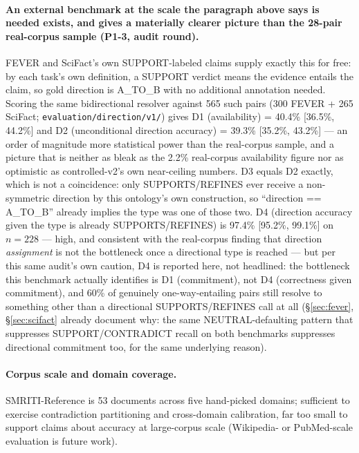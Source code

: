 \paragraph{An external benchmark at the scale the paragraph above says
is needed exists, and gives a materially clearer picture than the
28-pair real-corpus sample (P1-3, audit round).} FEVER and SciFact's own
SUPPORT-labeled claims supply exactly this for free: by each task's own
definition, a SUPPORT verdict means the evidence entails the claim, so
gold direction is A\_TO\_B with no additional annotation needed. Scoring
the same bidirectional resolver against 565 such pairs (300 FEVER + 265
SciFact; \texttt{evaluation/direction/v1/}) gives D1 (availability) =
40.4\% [36.5\%, 44.2\%] and D2 (unconditional direction accuracy) =
39.3\% [35.2\%, 43.2\%] --- an order of magnitude more statistical power
than the real-corpus sample, and a picture that is neither as bleak as
the 2.2\% real-corpus availability figure nor as optimistic as
controlled-v2's own near-ceiling numbers. D3 equals D2 exactly, which is
not a coincidence: only SUPPORTS/REFINES ever receive a non-symmetric
direction by this ontology's own construction, so ``direction ==
A\_TO\_B'' already implies the type was one of those two. D4 (direction
accuracy given the type is already SUPPORTS/REFINES) is 97.4\% [95.2\%,
99.1\%] on $n=228$ --- high, and consistent with the real-corpus finding
that direction \emph{assignment} is not the bottleneck once a
directional type is reached --- but per this same audit's own caution,
D4 is reported here, not headlined: the bottleneck this benchmark
actually identifies is D1 (commitment), not D4 (correctness given
commitment), and 60\% of genuinely one-way-entailing pairs still resolve
to something other than a directional SUPPORTS/REFINES call at all
(\S\ref{sec:fever}, \S\ref{sec:scifact} already document why: the same
NEUTRAL-defaulting pattern that suppresses SUPPORT/CONTRADICT recall on
both benchmarks suppresses directional commitment too, for the same
underlying reason).

\paragraph{Corpus scale and domain coverage.} SMRITI-Reference is 53
documents across five hand-picked domains; sufficient to exercise
contradiction partitioning and cross-domain calibration, far too small to
support claims about accuracy at large-corpus scale (Wikipedia- or
PubMed-scale evaluation is future work).

